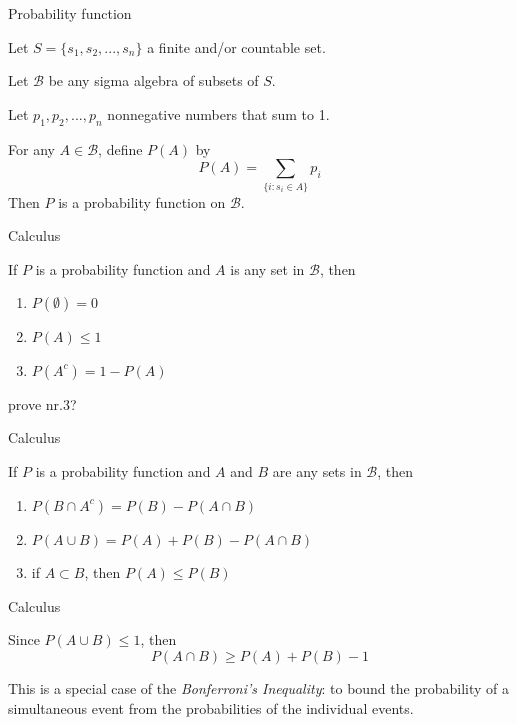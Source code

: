 \documentclass{beamer}
\begin{document}
\begin{frame}{Probability function}

	Let $S=\{s_1, s_2, ..., s_n\}$ a finite and/or countable set. 

	Let $\mathcal{B}$ be any sigma algebra of subsets of $S$. 

	Let $p_1, p_2, ..., p_n$ nonnegative numbers that sum to 1. 

	For any $A \in \mathcal{B}$, define $P(A)$ by
	\begin{equation*}
		P(A) = \sum_{\{i:s_i \in A\}} p_i
	\end{equation*}
	Then $P$ is a probability function on $\mathcal{B}$.

\end{frame}

\begin{frame}{Calculus}

	If $P$ is a probability function and $A$ is any set in $\mathcal{B}$, then
	\begin{enumerate}
		\item $P(\emptyset)=0$
		\item $P(A) \leq 1$
		\item $P(A^c) = 1 - P(A)$
	\end{enumerate}

	\vskip 1cm
	\tiny{prove nr.3?}

\end{frame}

\begin{frame}{Calculus}

	If $P$ is a probability function and $A$ and $B$ are any sets in $\mathcal{B}$, then
        \begin{enumerate}
                \item $P(B \cap A^c) = P(B) - P(A \cap B)$
                \item $P(A \cup B) = P(A) + P(B) - P(A \cap B)$
                \item if $A \subset B$, then $P(A) \leq P(B)$
        \end{enumerate}

\end{frame}

\begin{frame}{Calculus}

	Since $P(A \cup B) \leq 1$, then
	\begin{equation*}
		P(A \cap B) \geq P(A) + P(B) - 1
	\end{equation*}
	
	This is a special case of the \textit{Bonferroni's Inequality}: to bound the probability of a simultaneous 
	event from the probabilities of the individual events.

\end{frame}
\end{document}
